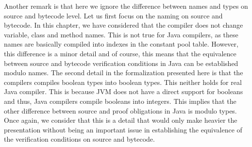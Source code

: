 Another remark is that here we ignore the difference between names and types on  source and bytecode level. 
Let us first focus on the naming on source and bytecode. 
In this chapter, we have considered that the compiler  does not change  variable, class and method  names.
 This is not true for Java compilers, as these names are basically compiled into 
indexes in the constant pool table. However, this difference is a minor detail and of course, this means that 
the equivalence between source and bytecode verification conditions in Java can be established modulo names.
The second detail in the formalization presented here is that the compilers compiles boolean types into boolean types.
This neither holds for real Java compiler. This is because JVM does not have a direct support  for booleans and thus,
Java compilers compile booleans into integers. This implies that the other difference between source and proof
obligations in Java is modulo types. Once again, we consider that this is a detail that would only make heavier
the presentation without being an important issue in establishing the equivalence of the verification conditions on source and bytecode. 
